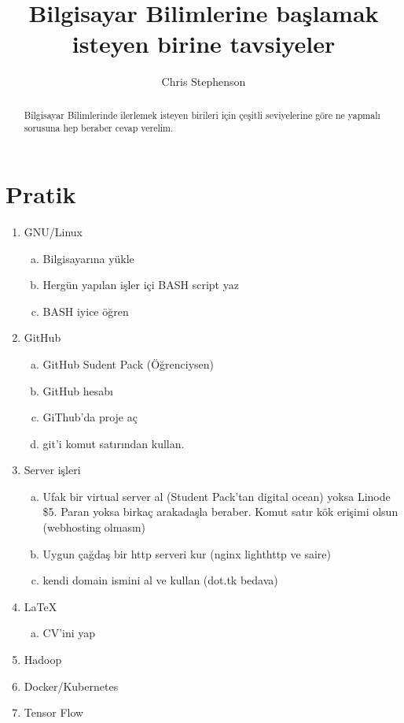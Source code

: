 \documentclass[a4paper,10pt]{article}
\title{Bilgisayar Bilimlerine başlamak isteyen birine tavsiyeler}
\author{Chris Stephenson}
\begin{document}
\maketitle

\begin{abstract}
Bilgisayar Bilimlerinde ilerlemek isteyen birileri için çeşitli seviyelerine göre ne yapmalı sorusuna hep beraber cevap verelim. 
\end{abstract}

\section*{Pratik}
\begin{enumerate}
  \item GNU/Linux
    \begin{enumerate}[(a)]
      \item Bilgisayarına yükle 
      \item Hergün yapılan işler içi BASH script yaz
      \item BASH iyice öğren
    \end{enumerate}
  \item GitHub
    \begin{enumerate}[(a)]
      \item GitHub Sudent Pack (Öğrenciysen)
      \item GitHub hesabı
      \item GiThub'da proje aç
      \item git'i komut satırından kullan.
    \end{enumerate}
  \item Server işleri
    \begin{enumerate}[(a)]
      \item Ufak bir virtual server al (Student Pack'tan digital ocean) yoksa Linode \$5. Paran yoksa birkaç arakadaşla beraber. Komut satır kök erişimi olsun (webhosting olmasın)
      \item Uygun çağdaş bir http serveri kur (nginx lighthttp ve saire)
      \item kendi domain ismini al ve kullan (dot.tk bedava)
    \end{enumerate}
  \item \LaTeX 
    \begin{enumerate}[(a)]
      \item CV'ini yap
    \end{enumerate}
   \item Hadoop
   \item Docker/Kubernetes
   \item Tensor Flow
    
\end{enumerate}
\end{document}
